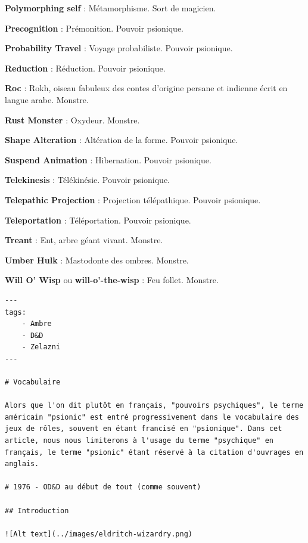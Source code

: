 \documentclass[11pt]{article}
\begin{document}
{{\textbf{Polymorphing self} : Métamorphisme. Sort de magicien.

\textbf{Precognition} : Prémonition. Pouvoir psionique.

\textbf{Probability Travel} : Voyage probabiliste. Pouvoir psionique.

\textbf{Reduction} : Réduction. Pouvoir psionique.

\textbf{Roc} : Rokh, oiseau fabuleux des contes d'origine persane et indienne écrit en langue arabe. Monstre.

\textbf{Rust Monster} : Oxydeur. Monstre.

\textbf{Shape Alteration} : Altération de la forme. Pouvoir psionique.

\textbf{Suspend Animation} : Hibernation. Pouvoir psionique.

\textbf{Telekinesis} : Télékinésie. Pouvoir psionique.

\textbf{Telepathic Projection} : Projection télépathique. Pouvoir psionique.

\textbf{Teleportation} : Téléportation. Pouvoir psionique.

\textbf{Treant} : Ent, arbre géant vivant. Monstre.

\textbf{Umber Hulk} : Mastodonte des ombres. Monstre.

\textbf{Will O’ Wisp} ou \textbf{will-o'-the-wisp} : Feu follet. Monstre.

}%













\begin{verbatim}
---
tags:
    - Ambre
    - D&D
    - Zelazni
---

# Vocabulaire

Alors que l'on dit plutôt en français, "pouvoirs psychiques", le terme américain "psionic" est entré progressivement dans le vocabulaire des jeux de rôles, souvent en étant francisé en "psionique". Dans cet article, nous nous limiterons à l'usage du terme "psychique" en français, le terme "psionic" étant réservé à la citation d'ouvrages en anglais.

# 1976 - OD&D au début de tout (comme souvent)

## Introduction

![Alt text](../images/eldritch-wizardry.png)


\end{verbatim}}
\end{document}
